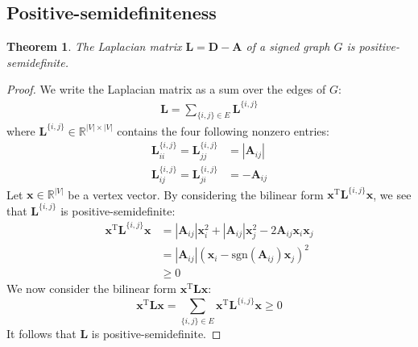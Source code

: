 \documentclass[11pt,a4paper]{book}
\newtheorem{theorem}{Theorem}
\begin{document}
\subsection{Positive-semidefiniteness}
\label{sec:signed-laplacian-positive-semidefinite}
\begin{theorem}
  \label{theo:l-positive-semidefinite}
  The Laplacian matrix $\mathbf L=\mathbf D-\mathbf A$ of a signed graph
  $G$ is positive-semidefinite. 
\end{theorem}
\begin{proof}
  We write the Laplacian matrix as a sum over the edges of $G$:
  \begin{align}
    \mathbf L = \sum_{\{i,j\} \in E} \mathbf L^{\{i,j\}}
  \end{align}
  where $\mathbf L^{\{i,j\}} \in \mathbb{R}^{|V| \times |V|}$ contains the four
  following nonzero entries: 
  \begin{align}
    \mathbf L^{\{i,j\}}_{ii} = \mathbf L^{\{i,j\}}_{jj} &= |\mathbf
    A_{ij}| 
    \label{eq:single-edge-laplacian} \\
    \mathbf L^{\{i,j\}}_{ij} = \mathbf L^{\{i,j\}}_{ji} &= -\mathbf
    A_{ij} \nonumber
  \end{align}
  Let $\mathbf x \in \mathbb{R}^{|V|}$ be a vertex vector. 
  By considering the bilinear form $\mathbf x^{\mathrm T} \mathbf
  L^{\{i,j\}} \mathbf x$,  
  we see that $\mathbf L^{\{i,j\}}$ is positive-semidefinite:
  \begin{align}
    \mathbf x^{\mathrm T} \mathbf L^{\{i,j\}} \mathbf x &= |\mathbf
    A_{ij}| \mathbf x_i^2 + |\mathbf
    A_{ij}| \mathbf x_j^2 -2 \mathbf A_{ij} \mathbf x_i
    \mathbf x_j \nonumber \\ 
    &= |\mathbf A_{ij}| (\mathbf x_i - \mathrm{sgn}(\mathbf A_{ij}) \mathbf
    x_j)^2 \nonumber   \\
    &\geq 0  \label{eq:bilinear}
  \end{align}
  We now consider the bilinear form $\mathbf x^{\mathrm T} \mathbf L
  \mathbf x$: 
  \begin{displaymath}
    \mathbf x^{\mathrm T}\mathbf L \mathbf x = \sum_{\{i,j\}\in E}
    \mathbf x^{\mathrm T} \mathbf L^{\{i,j\}} \mathbf x \ge 0
  \end{displaymath}
  It follows that $\mathbf L$ is positive-semidefinite. 
\end{proof}

\newcommand{\Eta}{H}
\end{document}

